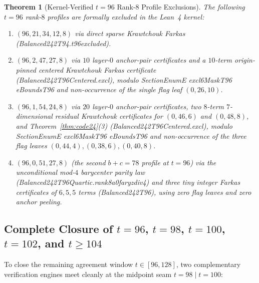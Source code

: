 \documentclass[11pt]{article}
\newtheorem{theorem}{Theorem}[section]
\theoremstyle{definition}
\newcommand{\code}[1]{{\ttfamily\small\renewcommand{\_}{\textunderscore\allowbreak}#1}}
\begin{document}
\begin{theorem}[Kernel-Verified $t = 96$ Rank-$8$ Profile Exclusions]
\label{thm:t96-profiles}
The following $t = 96$ rank-$8$ profiles are formally excluded in the Lean~4 kernel:
\begin{enumerate}[nosep]
  \item $(96, 21, 34, 12, 8)$ via direct sparse Krawtchouk Farkas (\code{Balanced242T94.t96\_21\_34\_12\_excluded}).
  \item $(96, 2, 47, 27, 8)$ via $10$ layer-$0$ anchor-pair certificates and a $10$-term origin-pinned centered Krawtchouk Farkas certificate (\code{Balanced242T96Centered.excl\_96\_2\_47\_27}), modulo \code{SectionEnumE excl6MaskT96 eBoundsT96} and non-occurrence of the single flag leaf $(0, 26, 10)$.
  \item $(96, 1, 54, 24, 8)$ via $20$ layer-$0$ anchor-pair certificates, two $8$-term $7$-dimensional residual Krawtchouk certificates for $(0, 46, 6)$ and $(0, 48, 8)$, and Theorem~\ref{thm:code24}(3) (\code{Balanced242T96Centered.excl\_96\_1\_54\_24}), modulo \code{SectionEnumE excl6MaskT96 eBoundsT96} and non-occurrence of the three flag leaves $(0,44,4), (0,38,6), (0,40,8)$.
  \item $(96, 0, 51, 27, 8)$ (the second $b + c = 78$ profile at $t = 96$) via the unconditional mod-$4$ barycenter parity law (\code{Balanced242T96Quartic.\allowbreak rank8\_a0\_far\_yz\_div4}) and three tiny integer Farkas certificates of $6, 5, 5$ terms (\code{Balanced242T96\_0\_51\_27}), using zero flag leaves and zero anchor peeling.
\end{enumerate}
\end{theorem}

\subsection{Complete Closure of $t = 96$, $t = 98$, $t = 100$, $t = 102$, and $t \ge 104$}
\label{sec:complete-closure}

To close the remaining agreement window $t \in [96, 128]$, two complementary verification engines meet cleanly at the midpoint seam $t = 98 \mid t = 100$:
\end{document}
